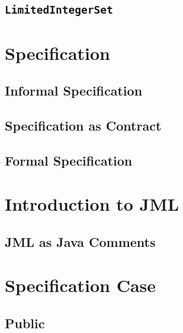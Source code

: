 \documentclass[a4paper, 11pt, accentcolor = tud3b]{tudreport}
\begin{document}
            \subsection{\texttt{LimitedIntegerSet}} %

        \section{Specification} %

            \subsection{Informal Specification} %

            \subsection{Specification as Contract} %

            \subsection{Formal Specification} %

        \section{Introduction to JML} %

            \subsection{JML as Java Comments} %

        \section{Specification Case} %

            \subsection{Public} %
\end{document}
